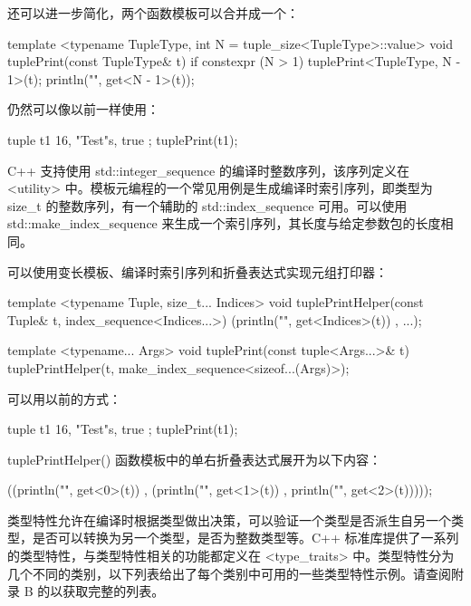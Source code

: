 还可以进一步简化，两个函数模板可以合并成一个：

\begin{cpp}
template <typename TupleType, int N = tuple_size<TupleType>::value>
void tuplePrint(const TupleType& t)
{
    if constexpr (N > 1) {
        tuplePrint<TupleType, N - 1>(t);
    }
    println("{}", get<N - 1>(t));
}
\end{cpp}

仍然可以像以前一样使用：

\begin{cpp}
tuple t1 { 16, "Test"s, true };
tuplePrint(t1);
\end{cpp}


C++ 支持使用 std::integer\_sequence 的编译时整数序列，该序列定义在 <utility> 中。模板元编程的一个常见用例是生成编译时索引序列，即类型为 size\_t 的整数序列，有一个辅助的 std::index\_sequence 可用。可以使用 std::make\_index\_sequence 来生成一个索引序列，其长度与给定参数包的长度相同。

可以使用变长模板、编译时索引序列和折叠表达式实现元组打印器：

\begin{cpp}
template <typename Tuple, size_t... Indices>
void tuplePrintHelper(const Tuple& t, index_sequence<Indices...>)
{
    (println("{}", get<Indices>(t)) , ...);
}

template <typename... Args>
void tuplePrint(const tuple<Args...>& t)
{
    tuplePrintHelper(t, make_index_sequence<sizeof...(Args)>{});
}
\end{cpp}

可以用以前的方式：

\begin{cpp}
tuple t1 { 16, "Test"s, true };
tuplePrint(t1);
\end{cpp}

tuplePrintHelper() 函数模板中的单右折叠表达式展开为以下内容：

\begin{cpp}
((println("{}", get<0>(t)) ,
 (println("{}", get<1>(t)) ,
  println("{}", get<2>(t)))));
\end{cpp}



类型特性允许在编译时根据类型做出决策，可以验证一个类型是否派生自另一个类型，是否可以转换为另一个类型，是否为整数类型等。C++ 标准库提供了一系列的类型特性，与类型特性相关的功能都定义在 <type\_traits> 中。类型特性分为几个不同的类别，以下列表给出了每个类别中可用的一些类型特性示例。请查阅附录 B 的以获取完整的列表。


